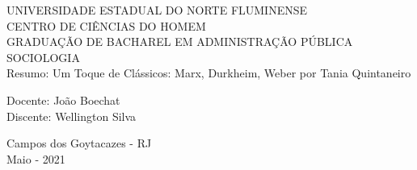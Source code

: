 \begin{center}
    {\large UNIVERSIDADE ESTADUAL DO NORTE FLUMINENSE}
    \\[0.2cm]
    {\large CENTRO DE CIÊNCIAS DO HOMEM}
    \\[0.2cm]
    {\large GRADUAÇÃO DE BACHAREL EM ADMINISTRAÇÃO PÚBLICA}
    \\[0.2cm]
    {\large SOCIOLOGIA}
    \\[8cm]
    { \huge Resumo: Um Toque de Clássicos: Marx, Durkheim, Weber por Tania Quintaneiro}
    \\[4cm]
\end{center}

\begin{flushleft}
    Docente: João Boechat\\[.2cm]
    Discente: Wellington Silva\\[4cm]
\end{flushleft}

\begin{center}
    {\large Campos dos Goytacazes - RJ}\\[0.2cm]
    {\large Maio - 2021}
\end{center}